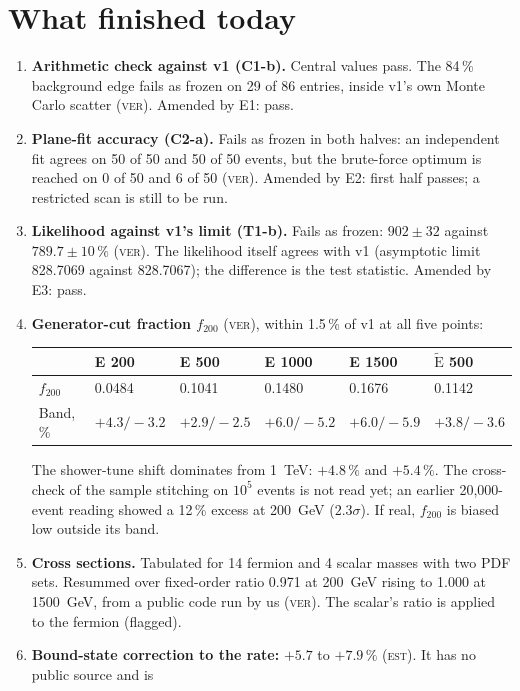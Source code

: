 \documentclass[11pt,a4paper]{article}
\newcommand{\est}{\textsc{est}}
\newcommand{\ver}{\textsc{ver}}
\begin{document}
\section{What finished today}
\begin{enumerate}
\item \textbf{Arithmetic check against v1 (C1-b).} Central values pass. The 84\,\% background edge fails as frozen
      on 29 of 86 entries, inside v1's own Monte Carlo scatter (\ver). Amended by E1: pass.
\item \textbf{Plane-fit accuracy (C2-a).} Fails as frozen in both halves: an independent fit agrees on 50 of 50
      and 50 of 50 events, but the brute-force optimum is reached on 0 of 50 and 6 of 50 (\ver). Amended by E2:
      first half passes; a restricted scan is still to be run.
\item \textbf{Likelihood against v1's limit (T1-b).} Fails as frozen: $902\pm32$ against $789.7\pm10\,\%$ (\ver).
      The likelihood itself agrees with v1 (asymptotic limit 828.7069 against 828.7067); the difference is the test
      statistic. Amended by E3: pass.
\item \textbf{Generator-cut fraction $f_{200}$} (\ver), within 1.5\,\% of v1 at all five points:
\begin{center}
\begin{tabular}{L{2.0cm}L{2.0cm}L{2.0cm}L{2.0cm}L{2.0cm}L{2.0cm}}
\toprule
 & E 200 & E 500 & E 1000 & E 1500 & $\tilde{\mathrm E}$ 500 \\
\midrule
$f_{200}$ & 0.0484 & 0.1041 & 0.1480 & 0.1676 & 0.1142 \\
Band, \% & $+4.3/-3.2$ & $+2.9/-2.5$ & $+6.0/-5.2$ & $+6.0/-5.9$ & $+3.8/-3.6$ \\
\bottomrule
\end{tabular}
\end{center}
      The shower-tune shift dominates from 1~TeV: $+4.8\,\%$ and $+5.4\,\%$. The cross-check of the sample stitching
      on $10^{5}$ events is not read yet; an earlier 20{,}000-event reading showed a 12\,\% excess at 200~GeV
      ($2.3\sigma$). If real, $f_{200}$ is biased low outside its band.
\item \textbf{Cross sections.} Tabulated for 14 fermion and 4 scalar masses with two PDF sets. Resummed over
      fixed-order ratio 0.971 at 200~GeV rising to 1.000 at 1500~GeV, from a public code run by us (\ver). The
      scalar's ratio is applied to the fermion (flagged).
\item \textbf{Bound-state correction to the rate:} $+5.7$ to $+7.9\,\%$ (\est). It has no public source and is

\end{enumerate}
\end{document}
